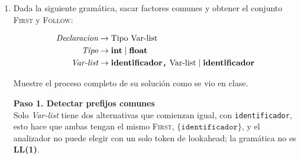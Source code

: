 \documentclass[12pt,letterpaper]{article}
\newcommand{\nt}[1]{\textit{#1}}
\newcommand{\tk}[1]{\texttt{#1}}
\newcommand{\tx}[1]{\text{#1}}
\newcommand{\eps}{\varepsilon}
\begin{document}
\begin{enumerate}[label=\arabic*.]
\begin{itemize}
\begin{itemize}
      \bigskip
      
    \item Tras un operando válido como \tk{num}, el analizador esperaría siempre un operador\\
      (\tk{+}, \tk{-} o \tk{*}) y nunca podría aceptar \tk{\$} o \tk{)}.\\
      En la tabla, las celdas
      \[
      \begin{aligned}
        M&\tk{[}\nt{Exp'},\ \tk{\$} \tk{]},\\
        M&\tk{[}\nt{Exp'},\ \tk{)} \tk{]},\\
        M&\tk{[}\nt{Term'},\ \tk{+} \tk{]},\\
        M&\tk{[}\nt{Term'},\ \tk{-} \tk{]},\\
        M&\tk{[}\nt{Term'},\ \tk{)} \tk{]},\\
        M&\tk{[}\nt{Term'},\ \tk{\$} \tk{]}
      \end{aligned}
      \]
      quedarían vacías, es decir, que hay error sintáctico; incluso la entrada más simple, \tk{num}, sería
      rechazada.
    \end{itemize}
    
    Por eso es necesario agregar $\eps$ a ambos, pues nos permite que las listas de operaciones terminen,
    haciendo que $\nt{Exp'}$ y $\nt{Term'}$ sean anulables y habilita las entradas basadas en \textsc{Follow}
    de la tabla.
    
  \end{itemize}

  
\newpage


\item Dada la siguiente gramática, sacar factores comunes y obtener el conjunto \textsc{First} y \textsc{Follow}:

  \[
  \begin{aligned}
    \nt{Declaracion} &\to \tx{Tipo}\ \tx{Var-list} \\
    \nt{Tipo}        &\to \bf{int} \mid \bf{float} \\
    \nt{Var-list}    &\to \bf{identificador} \tk{,}\ \tx{Var-list} \mid \bf{identificador}
  \end{aligned}
  \]

  Muestre el proceso completo de su solución como se vio en clase.
  
  \bigskip

  \textbf{Paso 1. Detectar prefijos comunes}\\
  Solo \nt{Var-list} tiene dos alternativas que comienzan igual, con \tk{identificador}, esto hace que ambas
  tengan el mismo \textsc{First}, $\{\tk{identificador}\}$, y el analizador no puede elegir con un solo token
  de lookahead; la gramática no es \textbf{LL(1)}.\\
  

\end{enumerate}
\end{document}
